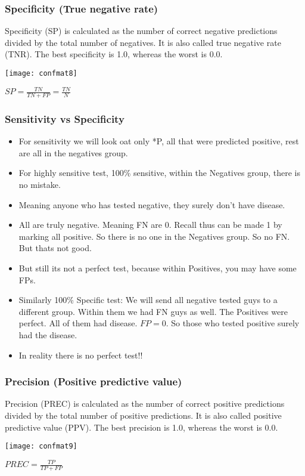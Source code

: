\begin{frame}[fragile]\frametitle{Specificity (True negative rate)}

Specificity (SP) is calculated as the number of correct negative predictions divided by
the total number of negatives. It is also called true negative rate (TNR). The best
specificity is 1.0, whereas the worst is 0.0.

\begin{center}
\texttt{[image: confmat8]}
\end{center}

$SP = \frac{TN}{TN+FP} = \frac{TN}{N}$
\end{frame}


\begin{frame}[fragile]\frametitle{Sensitivity vs Specificity}

	\begin{itemize}
	\item For sensitivity we will look oat only *P, all that were predicted positive, rest are all in the negatives group.
	\item For highly sensitive test, 100\% sensitive, within the Negatives group, there is no mistake. 
	\item Meaning anyone who has tested negative, they surely don't have disease.
	\item All are truly negative. Meaning FN are 0. Recall thus can be made 1 by marking all positive. So there is no one in the Negatives group. So no FN. But thats not good.
	\item But still its not a perfect test, because within Positives, you may have some FPs.
	\item Similarly 100\% Specific test: We will send all negative tested guys to a different group. Within them we had FN guys as well. The Positives were perfect. All of them had disease. $FP=0$. So those who tested positive surely had the disease.
	\item In reality there is no perfect test!!
	\end{itemize}

\end{frame}


\begin{frame}[fragile]\frametitle{Precision (Positive predictive value)}
Precision (PREC) is calculated as the number of correct positive predictions divided
by the total number of positive predictions. It is also called positive predictive value
(PPV). The best precision is 1.0, whereas the worst is 0.0.

\begin{center}
\texttt{[image: confmat9]}
\end{center}

$PREC = \frac{TP}{TP+FP}$
\end{frame}

